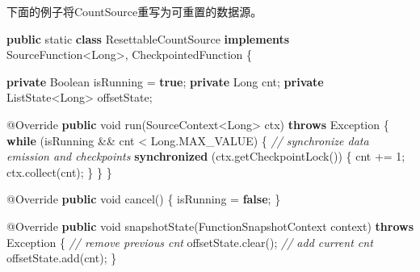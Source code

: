 \documentclass[cn,11pt,chinese]{elegantbook}
\newenvironment{Shaded}{}{}
\newcommand{\AttributeTok}[1]{\textcolor[rgb]{0.49,0.56,0.16}{#1}}
\newcommand{\BuiltInTok}[1]{#1}
\newcommand{\CommentTok}[1]{\textcolor[rgb]{0.38,0.63,0.69}{\textit{#1}}}
\newcommand{\DataTypeTok}[1]{\textcolor[rgb]{0.56,0.13,0.00}{#1}}
\newcommand{\DecValTok}[1]{\textcolor[rgb]{0.25,0.63,0.44}{#1}}
\newcommand{\FunctionTok}[1]{\textcolor[rgb]{0.02,0.16,0.49}{#1}}
\newcommand{\KeywordTok}[1]{\textcolor[rgb]{0.00,0.44,0.13}{\textbf{#1}}}
\newcommand{\NormalTok}[1]{#1}
\begin{document}
下面的例子将CountSource重写为可重置的数据源。

\begin{Shaded}
\begin{Highlighting}[]
\KeywordTok{public} \DataTypeTok{static} \KeywordTok{class}\NormalTok{ ResettableCountSource}
        \KeywordTok{implements}\NormalTok{ SourceFunction\textless{}}\BuiltInTok{Long}\NormalTok{\textgreater{}, CheckpointedFunction \{}

    \KeywordTok{private} \BuiltInTok{Boolean}\NormalTok{ isRunning = }\KeywordTok{true}\NormalTok{;}
    \KeywordTok{private} \BuiltInTok{Long}\NormalTok{ cnt;}
    \KeywordTok{private}\NormalTok{ ListState\textless{}}\BuiltInTok{Long}\NormalTok{\textgreater{} offsetState;}

    \AttributeTok{@Override}
    \KeywordTok{public} \DataTypeTok{void} \FunctionTok{run}\NormalTok{(SourceContext\textless{}}\BuiltInTok{Long}\NormalTok{\textgreater{} ctx) }\KeywordTok{throws} \BuiltInTok{Exception}\NormalTok{ \{}
        \KeywordTok{while}\NormalTok{ (isRunning \&\& cnt \textless{} }\BuiltInTok{Long}\NormalTok{.}\FunctionTok{MAX\_VALUE}\NormalTok{) \{}
            \CommentTok{// synchronize data emission and checkpoints}
            \KeywordTok{synchronized}\NormalTok{ (ctx.}\FunctionTok{getCheckpointLock}\NormalTok{()) \{}
\NormalTok{                cnt += }\DecValTok{1}\NormalTok{;}
\NormalTok{                ctx.}\FunctionTok{collect}\NormalTok{(cnt);}
\NormalTok{            \}}
\NormalTok{        \}}
\NormalTok{    \}}

    \AttributeTok{@Override}
    \KeywordTok{public} \DataTypeTok{void} \FunctionTok{cancel}\NormalTok{() \{}
\NormalTok{        isRunning = }\KeywordTok{false}\NormalTok{;}
\NormalTok{    \}}

    \AttributeTok{@Override}
    \KeywordTok{public} \DataTypeTok{void} \FunctionTok{snapshotState}\NormalTok{(FunctionSnapshotContext context) }\KeywordTok{throws} \BuiltInTok{Exception}\NormalTok{ \{}
        \CommentTok{// remove previous cnt}
\NormalTok{        offsetState.}\FunctionTok{clear}\NormalTok{();}
        \CommentTok{// add current cnt}
\NormalTok{        offsetState.}\FunctionTok{add}\NormalTok{(cnt);}
\NormalTok{    \}}


\end{Highlighting}
\end{Shaded}
\end{document}
